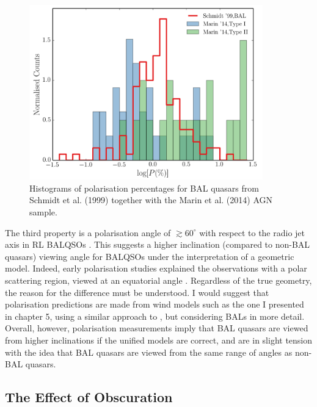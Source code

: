 \begin{figure}
\centering
\includegraphics[width=0.9\textwidth]{figures/ewpaper/hist_p2.png}
\caption
{
Histograms of polarisation percentages 
for BAL quasars from Schmidt et al. (1999) together with the 
Marin et al. (2014) AGN sample. 
}
\label{fig:bal_polarisation}
\end{figure}

The third property is a polarisation angle of $\gtrsim60^\circ$ with respect
to the radio jet axis in RL BALQSOs \citep[][and references therein]{brotherton2006}.
This suggests a higher inclination (compared to non-BAL quasars)
viewing angle for BALQSOs under the interpretation of a geometric model. Indeed,
early polarisation studies explained the observations with a polar scattering region,
viewed at an equatorial angle 
\citep[e.g.][]{goodrich1995, cohen1995,lamy2004}. Regardless of
the true geometry, the reason for the difference must be understood.
I would suggest that polarisation predictions are made from wind
models such as the one I presented in chapter 5, using a similar
approach to \cite{marin2013}, but considering BALs in more detail. 
Overall, however, polarisation measurements imply that BAL quasars are viewed
from higher inclinations if the unified models are correct, and are 
in slight tension with the idea that BAL quasars are viewed from the same range
of angles as non-BAL quasars.

\subsection{The Effect of Obscuration}
\label{sec:obscure}






